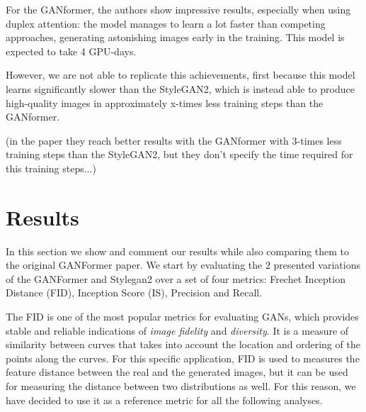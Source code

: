 \documentclass{article}
\begin{document}
	For the GANformer, the authors \cite{karras2020analyzing} show impressive results, especially when 
	using duplex attention: the model manages to learn a lot faster than competing approaches, 
	generating astonishing images early in the training. This model is expected to take 4 GPU-days.
	
	However, we are not able to replicate this achievements, first because this model learns significantly 
	slower than the StyleGAN2, which is instead able to produce high-quality images in approximately 
	x-times less training steps than the GANformer.
	
	(in the paper they reach better results with the GANformer with 3-times less training steps than the 
	StyleGAN2, but they don't specify the time required for this training steps...)

	\section{Results}%
	In this section we show and comment our results while also comparing them to the original GANFormer paper.
	We start by evaluating the 2 presented variations of the GANFormer and Stylegan2 over a set of 
	four metrics: Frechet Inception Distance (FID), Inception Score (IS), Precision and Recall.
	
	The FID is one of the most popular metrics for evaluating GANs, which provides stable and reliable 
	indications of \textit{image fidelity} and \textit{diversity}. 
	It is a measure of similarity between curves that takes into account the location and ordering of the 
	points along the curves. 
	For this specific application, FID is used to measures the feature distance between the real and the 
	generated images, but it can be used for measuring the distance between two distributions as well.
	For this reason, we have decided to use it as a reference metric for all the following analyses.
	
\end{document}
